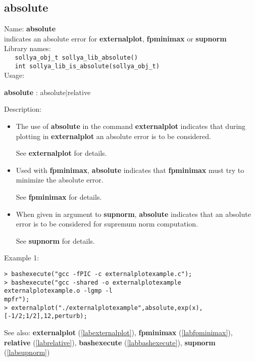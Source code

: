 \subsection{absolute}
\label{lababsolute}
\noindent Name: \textbf{absolute}\\
\phantom{aaa}indicates an absolute error for \textbf{externalplot}, \textbf{fpminimax} or \textbf{supnorm}\\[0.2cm]
\noindent Library names:\\
\verb|   sollya_obj_t sollya_lib_absolute()|\\
\verb|   int sollya_lib_is_absolute(sollya_obj_t)|\\[0.2cm]
\noindent Usage: 
\begin{center}
\textbf{absolute} : \textsf{absolute$|$relative}\\
\end{center}
\noindent Description: \begin{itemize}

\item The use of \textbf{absolute} in the command \textbf{externalplot} indicates that during
   plotting in \textbf{externalplot} an absolute error is to be considered.
    
   See \textbf{externalplot} for details.

\item Used with \textbf{fpminimax}, \textbf{absolute} indicates that \textbf{fpminimax} must try to minimize
   the absolute error.
    
   See \textbf{fpminimax} for details.

\item When given in argument to \textbf{supnorm}, \textbf{absolute} indicates that an absolute error
   is to be considered for supremum norm computation.
    
   See \textbf{supnorm} for details.
\end{itemize}
\noindent Example 1: 
\begin{center}\begin{minipage}{15cm}\begin{Verbatim}[frame=single,commandchars=\\\|\~]
> bashexecute("gcc -fPIC -c externalplotexample.c");
> bashexecute("gcc -shared -o externalplotexample externalplotexample.o -lgmp -l
mpfr");
> externalplot("./externalplotexample",absolute,exp(x),[-1/2;1/2],12,perturb);
\end{Verbatim}
\end{minipage}\end{center}
See also: \textbf{externalplot} (\ref{labexternalplot}), \textbf{fpminimax} (\ref{labfpminimax}), \textbf{relative} (\ref{labrelative}), \textbf{bashexecute} (\ref{labbashexecute}), \textbf{supnorm} (\ref{labsupnorm})
